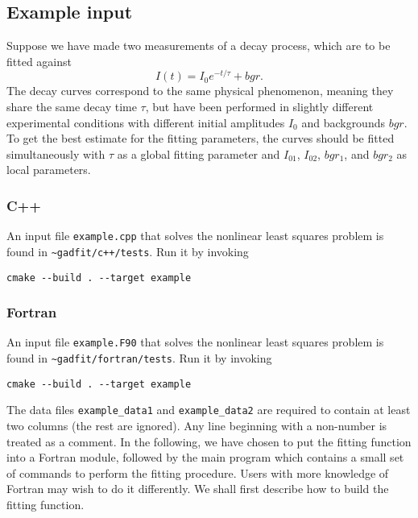 \documentclass{article}
\begin{document}
\subsection{\label{sec:example}Example input}

Suppose we have made two measurements of a decay process, which are to be fitted against
\begin{equation}
  \label{eq:exp_decay}
  I(t) = I_0e^{-t/\tau} + bgr.
\end{equation}
The decay curves correspond to the same physical phenomenon, meaning they share the same decay time $\tau$, but have been performed in slightly different experimental conditions with different initial amplitudes $I_0$ and backgrounds $bgr$. To get the best estimate for the fitting parameters, the curves should be fitted simultaneously with $\tau$ as a global fitting parameter and $I_{01}$, $I_{02}$, $bgr_1$, and $bgr_2$ as local parameters.

\subsubsection{C++}

An input file \texttt{example.cpp} that solves the nonlinear least squares problem is found in \verb+~+\texttt{gadfit/c++/tests}. Run it by invoking
\begin{verbatim}
cmake --build . --target example
\end{verbatim}

\subsubsection{Fortran}

An input file \texttt{example.F90} that solves the nonlinear least squares problem is found in \verb+~gadfit/fortran/tests+. Run it by invoking
\begin{verbatim}
cmake --build . --target example
\end{verbatim}
The data files \verb+example_data1+ and \verb+example_data2+ are required to contain at least two columns (the rest are ignored). Any line beginning with a non-number is treated as a comment. In the following, we have chosen to put the fitting function into a Fortran module, followed by the main program which contains a small set of commands to perform the fitting procedure. Users with more knowledge of Fortran may wish to do it differently. We shall first describe how to build the fitting function.
\end{document}
